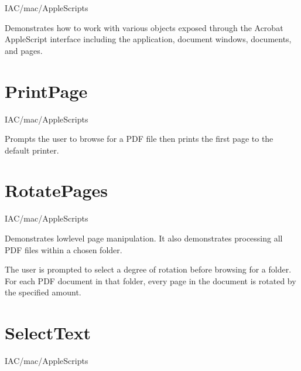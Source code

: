 \documentclass[letterpaper,12pt,english,openany,oneside]{sphinxmanual}
\begin{document}
IAC/mac/AppleScripts

\label{\detokenize{Samples_MacintoshIAC:description-1}}

Demonstrates how to work with various objects exposed through the Acrobat AppleScript interface including the application, document windows, documents, and pages.


\section{PrintPage}
\label{\detokenize{Samples_MacintoshIAC:printpage}}\label{\detokenize{Samples_MacintoshIAC:location-2}}

IAC/mac/AppleScripts

\label{\detokenize{Samples_MacintoshIAC:description-2}}

Prompts the user to browse for a PDF file then prints the first page to the default printer.


\section{RotatePages}
\label{\detokenize{Samples_MacintoshIAC:rotatepages}}\label{\detokenize{Samples_MacintoshIAC:location-3}}

IAC/mac/AppleScripts

\label{\detokenize{Samples_MacintoshIAC:description-3}}

Demonstrates low\sphinxhyphen{}level page manipulation. It also demonstrates processing all PDF files within a chosen folder.

The user is prompted to select a degree of rotation before browsing for a folder. For each PDF document in that folder, every page in the document is rotated by the specified amount.


\section{SelectText}
\label{\detokenize{Samples_MacintoshIAC:selecttext}}\label{\detokenize{Samples_MacintoshIAC:location-4}}

IAC/mac/AppleScripts

\label{\detokenize{Samples_MacintoshIAC:description-4}}
\end{document}
